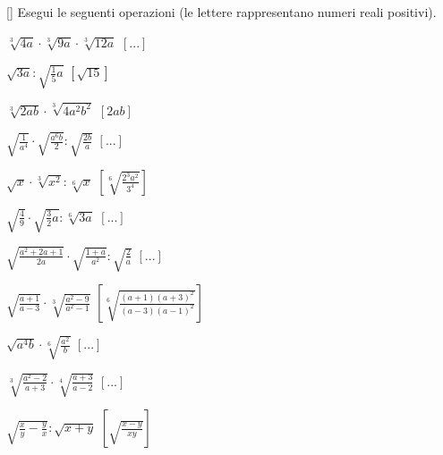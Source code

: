 \begin{esercizio}
 \label{ese:2.35}[\Ast]
Esegui le seguenti operazioni (le lettere rappresentano numeri reali positivi).
 \begin{multicols}{2}
 \begin{enumeratea}
 \item $\sqrt[3]{4a}\cdot \sqrt[3]{9a}\cdot \sqrt[3]{12a}$
  \hfill $\left[...\right]$
 \item $\sqrt{3a}:\sqrt{\frac 1 5a}$
  \hfill $\left[\sqrt{15}\right]$
 \item $\sqrt[3]{2ab}\cdot \sqrt[3]{4a^2b^2}$
  \hfill $\left[2ab\right]$
 \item $\sqrt{\frac 1{a^4}}\cdot \sqrt{\frac{a^6b} 2}:\sqrt{\frac{2b} a}$
  \hfill $\left[...\right]$
 \item $\sqrt x\cdot \sqrt[3]{x^2}:\sqrt[6]x$
  \hfill $\left[\sqrt[6]{\frac{2^3a^2}{3^4}}\right]$
 \item $\sqrt{\frac 4 9}\cdot \sqrt{\frac 3 2a}:\sqrt[6]{3a}$
  \hfill $\left[...\right]$
 \item $\sqrt{\frac{a^2+2a+1}{2a}}\cdot \sqrt{\frac{1+a}{a^2}}:
        \sqrt{\frac 2 a}$
  \hfill $\left[...\right]$
 \item $\sqrt{\frac{a+1}{a-3}}\cdot \sqrt[3]{\frac{a^2-9}{a^2-1}}$
  \hfill $\left[\sqrt[6]{\frac{(a+1)(a+3)^2}{(a-3)(a-1)^2}}\right]$
 \item $\sqrt{a^4b}\cdot \sqrt[6]{\frac{a^2} b}$
  \hfill $\left[...\right]$
 \item $\sqrt[3]{\frac{a^2-2}{a+3}}\cdot \sqrt[4]{\frac{a+3}{a-2}}$
  \hfill $\left[...\right]$
 \item $\sqrt{\frac x y-\frac y x}:\sqrt{x+y}$
  \hfill $\left[\sqrt{\frac{x-y}{xy}}\right]$
 \end{enumeratea}
 \end{multicols}
\end{esercizio}


